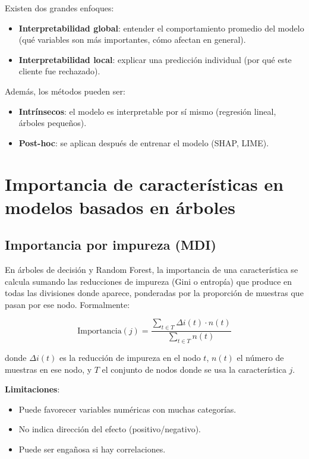 \documentclass[12pt,a4paper,openany,oneside]{book}
\begin{document}
Existen dos grandes enfoques:
\begin{itemize}
    \item \textbf{Interpretabilidad global}: entender el comportamiento promedio del modelo (qué variables son más importantes, cómo afectan en general).
    \item \textbf{Interpretabilidad local}: explicar una predicción individual (por qué este cliente fue rechazado).
\end{itemize}

Además, los métodos pueden ser:
\begin{itemize}
    \item \textbf{Intrínsecos}: el modelo es interpretable por sí mismo (regresión lineal, árboles pequeños).
    \item \textbf{Post-hoc}: se aplican después de entrenar el modelo (SHAP, LIME).
\end{itemize}

\section{Importancia de características en modelos basados en árboles}

\subsection{Importancia por impureza (MDI)}
En árboles de decisión y Random Forest, la importancia de una característica se calcula sumando las reducciones de impureza (Gini o entropía) que produce en todas las divisiones donde aparece, ponderadas por la proporción de muestras que pasan por ese nodo. Formalmente:

\[
\text{Importancia}(j) = \frac{\sum_{t \in T} \Delta i(t) \cdot n(t)}{\sum_{t \in T} n(t)}
\]

donde \( \Delta i(t) \) es la reducción de impureza en el nodo \(t\), \(n(t)\) el número de muestras en ese nodo, y \(T\) el conjunto de nodos donde se usa la característica \(j\).

\textbf{Limitaciones}:
\begin{itemize}
    \item Puede favorecer variables numéricas con muchas categorías.
    \item No indica dirección del efecto (positivo/negativo).
    \item Puede ser engañosa si hay correlaciones.
\end{itemize}
\end{document}
